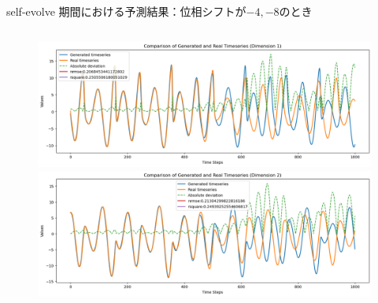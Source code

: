 \begin{frame}{self-evolve 期間における予測結果：位相シフトが$-4, -8$のとき}
    \begin{columns}[T] %
      \begin{column}{.5\textwidth}
        \begin{figure}
            \vspace{-.5cm}
            \begin{minipage}[c][.27\textheight][c]{\linewidth}
              \centering
              \includegraphics[width=0.7\linewidth]{Fig/-4.x.png}
            \end{minipage}
        
            \vspace{-.5em}
    
            \begin{minipage}[c][.27\textheight][c]{\linewidth}
              \centering
              \includegraphics[width=0.7\linewidth]{Fig/-4.y.png}
            \end{minipage}
            

\end{figure}
\end{column}
\end{columns}
\end{frame}

